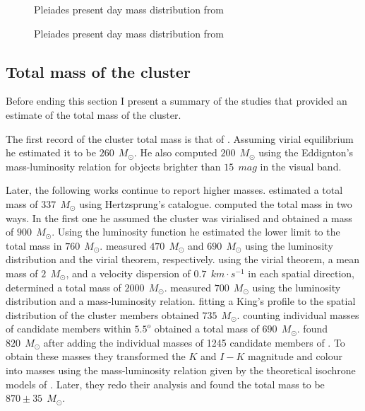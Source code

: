 \begin{figure}[htbp]
\begin{center}
\caption{Pleiades present day mass distribution  from \citet{Lodieu2012}}
\label{fig:massLodieu}
\end{center}
\end{figure}

\begin{figure}[htbp]
\begin{center}
\caption{Pleiades present day mass distribution  from \citet{Bouy2015}}
\label{fig:massBouy}
\end{center}
\end{figure}

\subsection{Total mass of the cluster}
Before ending this section I present a summary of the studies that provided an estimate of the total mass of the cluster.

The first record of the cluster total mass is that of \citet{1938AJ.....47...25T}. Assuming virial equilibrium he estimated it to be $260 \ \ M_{\odot}$. He also computed $200 \ \ M_{\odot}$ using the Eddignton's mass-luminosity relation for objects brighter than $15 \ \ mag$ in the visual band.

Later, the following works continue to report higher masses. \citet{1956MNRAS.116..296W} estimated a total mass of $337 \ \ M_{\odot}$ using Hertzsprung's catalogue. \citet{Limber1962} computed the total mass in two ways. In the first one he assumed the cluster was virialised and obtained a mass of $900 \ \ M_{\odot}$. Using the luminosity function he estimated the lower limit to the total mass in $760 \ \ M_{\odot}$. \citet{1970AJ.....75..563J} measured $470\ \ M_{\odot}$ and $690\ \ M_{\odot}$ using the luminosity distribution and the virial theorem, respectively. \citet{1980IAUS...85..157V} using the virial theorem, a mean mass of $2\ \ M_{\odot}$, and a velocity dispersion of $0.7\ \ km \cdot s^{-1}$ in each spatial direction, determined a total mass of $2000 \ \ M_{\odot}$. \citet{1995JKAS...28...45L} measured $700 \ \ M_{\odot}$ using the luminosity distribution and a mass-luminosity relation. \citet{Pinfield1998} fitting a King's profile to the spatial distribution of the cluster members obtained $735\ \ M_{\odot}$. \citet{2001AJ....121.2053A} counting individual masses of candidate members within $5.5^o$ obtained a total mass of $690 \ \ M_{\odot}$. \citet{Converse2008} found $820 \ \ M_{\odot}$ after adding the individual masses of 1245  candidate members of \citet{Stauffer2007}. To obtain these masses they  transformed the $K$ and $I-K$ magnitude and colour into masses using the mass-luminosity relation given by the theoretical isochrone models of \citet{1998A&A...337..403B}. Later, \citet{Converse2010} they redo their analysis and found the total mass to be $870\pm35\ \ M_{\odot}$.

